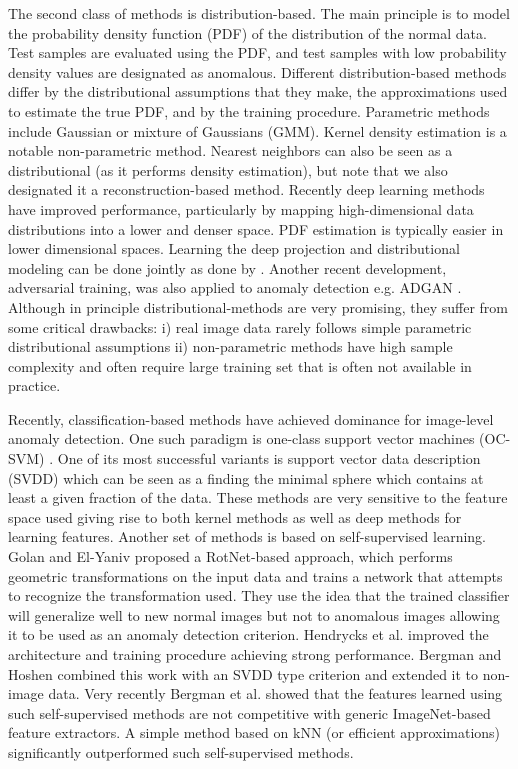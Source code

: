 \documentclass[runningheads]{llncs}
\begin{document}
The second class of methods is distribution-based. The main principle is to model the probability density function (PDF) of the distribution of the normal data. Test samples are evaluated using the PDF, and test samples with low probability density values are designated as anomalous. Different distribution-based methods differ by the distributional assumptions that they make, the approximations used to estimate the true PDF, and by the training procedure. Parametric methods include Gaussian or mixture of Gaussians (GMM). Kernel density estimation \cite{latecki2007outlier} is a notable non-parametric method. Nearest neighbors  \cite{eskin2002geometric} can also be seen as a distributional (as it performs density estimation), but note that we also designated it a reconstruction-based method. Recently deep learning methods have improved performance, particularly by mapping high-dimensional data distributions into a lower and denser space. PDF estimation is typically easier in lower dimensional spaces. Learning the deep projection and distributional modeling can be done jointly as done by \cite{zong2018deep}. Another recent development, adversarial training, was also applied to anomaly detection e.g. ADGAN \cite{deecke2018anomaly}. Although in principle distributional-methods are very promising, they suffer from some critical drawbacks: i) real image data rarely follows simple parametric distributional assumptions ii) non-parametric methods have high sample complexity and often require large training set that is often not available in practice.

Recently, classification-based methods have achieved dominance for image-level anomaly detection. One such paradigm is one-class support vector machines (OC-SVM) \cite{scholkopf2000support}. One of its most successful variants is support vector data description (SVDD) \cite{tax2004support} which can be seen as a finding the minimal sphere which contains at least a given fraction of the data. These methods are very sensitive to the feature space used giving rise to both kernel methods as well as deep methods \cite{ruff2018deep} for learning features. Another set of methods is based on self-supervised learning. Golan and El-Yaniv \cite{golan2018deep} proposed a RotNet-based \cite{gidaris2018unsupervised} approach, which performs geometric transformations on the input data and trains a network that attempts to recognize the transformation used. They use the idea that the trained classifier will generalize well to new normal images but not to anomalous images allowing it to be used as an anomaly detection criterion. Hendrycks et al. \cite{hendrycks2018deep} improved the architecture and training procedure achieving strong performance. Bergman and Hoshen \cite{bergman2020classification} combined this work with an SVDD type criterion and extended it to non-image data. Very recently Bergman et al. \cite{bergman2020deep} showed that the features learned using such self-supervised methods are not competitive with generic ImageNet-based feature extractors. A simple method based on kNN (or efficient approximations) significantly outperformed such self-supervised methods. 
\end{document}
